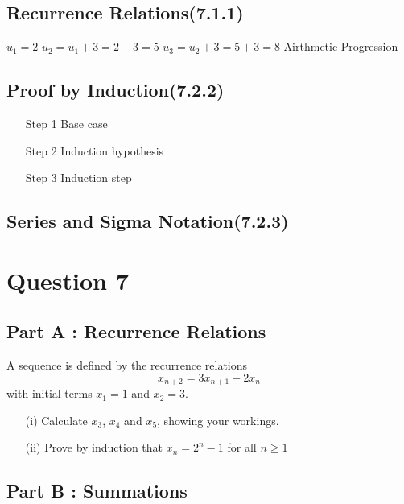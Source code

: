 \documentclass[]{report}
\begin{document}
				\subsection*{Recurrence Relations(7.1.1)}
				
				
				
				$u_1 = 2$
				$u_2 = u_1 + 3 = 2 +3 = 5$
				$u_3 = u_2 + 3 = 5+ 3 = 8$
				Airthmetic Progression
				
				
				\subsection*{Proof by Induction(7.2.2)}
				\begin{itemize}
					\item[Step 1] Base case
					\item[Step 2] Induction hypothesis
					\item[Step 3] Induction step
				\end{itemize}
				
				
				
				\subsection*{Series and Sigma Notation(7.2.3)}
				
				
				
	\section*{Question 7}
	\subsection*{Part A : Recurrence Relations}
	A sequence is defined by the recurrence relations
	\[x_{n+2}  = 3x_{n+1} - 2x_n\]
	with initial terms $x_1 = 1$ and $x_2=3$.
	
	\begin{itemize}
		\item[(i)] Calculate $x_3$, $x_4$ and $x_5$, showing your workings.
		\item[(ii)] Prove by induction that $x_n = 2^n - 1$ for all $n \geq 1$
	\end{itemize}
	
	\subsection*{Part B : Summations}
	
\end{document}
